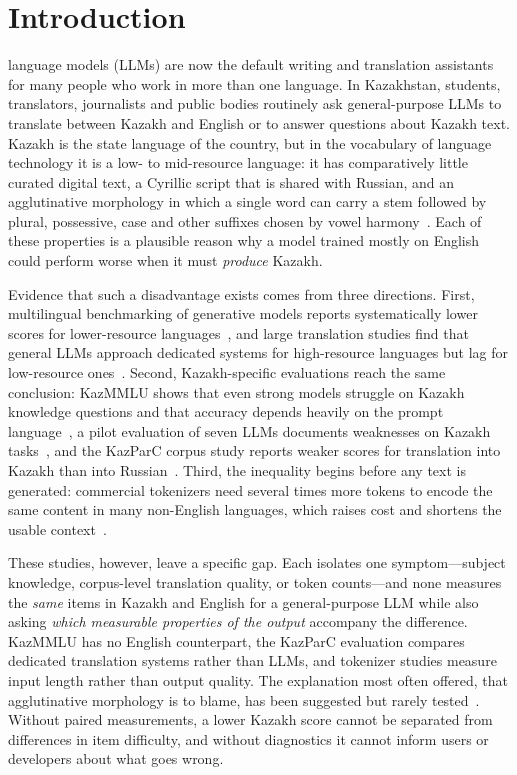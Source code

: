 \section{Introduction}
\label{sec:intro}

 language models (LLMs) are now the default writing and translation assistants for many people who work in more than one language. In Kazakhstan, students, translators, journalists and public bodies routinely ask general-purpose LLMs to translate between Kazakh and English or to answer questions about Kazakh text. Kazakh is the state language of the country, but in the vocabulary of language technology it is a low- to mid-resource language: it has comparatively little curated digital text, a Cyrillic script that is shared with Russian, and an agglutinative morphology in which a single word can carry a stem followed by plural, possessive, case and other suffixes chosen by vowel harmony~\cite{joshi2020state,mirzakhalov2021turkic}. Each of these properties is a plausible reason why a model trained mostly on English could perform worse when it must \emph{produce} Kazakh.

Evidence that such a disadvantage exists comes from three directions. First, multilingual benchmarking of generative models reports systematically lower scores for lower-resource languages~\cite{ahuja2023mega,lai2023beyond}, and large translation studies find that general LLMs approach dedicated systems for high-resource languages but lag for low-resource ones~\cite{robinson2023chatgpt,zhu2024multilingual}. Second, Kazakh-specific evaluations reach the same conclusion: KazMMLU shows that even strong models struggle on Kazakh knowledge questions and that accuracy depends heavily on the prompt language~\cite{togmanov2025kazmmlu}, a pilot evaluation of seven LLMs documents weaknesses on Kazakh tasks~\cite{maxutov2024kazakh}, and the KazParC corpus study reports weaker scores for translation into Kazakh than into Russian~\cite{yeshpanov2024kazparc}. Third, the inequality begins before any text is generated: commercial tokenizers need several times more tokens to encode the same content in many non-English languages, which raises cost and shortens the usable context~\cite{petrov2023tokenizer,ahia2023cost}.

These studies, however, leave a specific gap. Each isolates one symptom---subject knowledge, corpus-level translation quality, or token counts---and none measures the \emph{same} items in Kazakh and English for a general-purpose LLM while also asking \emph{which measurable properties of the output} accompany the difference. KazMMLU has no English counterpart, the KazParC evaluation compares dedicated translation systems rather than LLMs, and tokenizer studies measure input length rather than output quality. The explanation most often offered, that agglutinative morphology is to blame, has been suggested but rarely tested~\cite{yeshpanov2024kazparc}. Without paired measurements, a lower Kazakh score cannot be separated from differences in item difficulty, and without diagnostics it cannot inform users or developers about what goes wrong.

